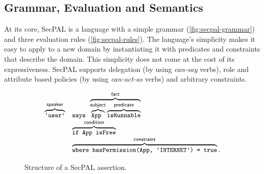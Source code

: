 \documentclass[thesis.tex]{subfiles}
\begin{document}
\subsection{Grammar, Evaluation and Semantics}

At its core, SecPAL is a language with a simple grammar
(\autoref{fig:secpal-grammar}) and three evaluation rules
(\autoref{fig:secpal-rules}). The language's simplicity makes it easy
to apply to a new domain by instantiating it with predicates and
constraints that describe the domain. This simplicity does not come at
the cost of its expressiveness. SecPAL supports delegation (by using
\emph{can-say} verbs), role and attribute based policies (by using
\emph{can-act-as} verbs) and arbitrary constraints.

\begin{figure}
  \newcommand{\bracetext}[1]{\text{\sffamily #1}}
  \newcommand{\smalltext}[1]{\text{\ttfamily\small #1}}
  \centering
  \begin{equation*}
    \begin{array}{r l}
      \overbrace{\smalltext{`user'}}^{\bracetext{speaker}} &
                                                             \smalltext{ says }\overbrace{\overbrace{\smalltext{ App }}^{\bracetext{subject}}\overbrace{\smalltext{ isRunnable}}^{\bracetext{predicate}}}^{\bracetext{fact}} \\
                                                           & \overbrace{\smalltext{ if App isFree}}^{\bracetext{condition}} \\
                                                           & \overbrace{\smalltext{ where hasPermission(App, `INTERNET') = true}}^{\bracetext{constraint}}.
    \end{array}
  \end{equation*}
  \caption{Structure of a SecPAL assertion.}
  \label{fig:assertion}
\end{figure}
\end{document}
